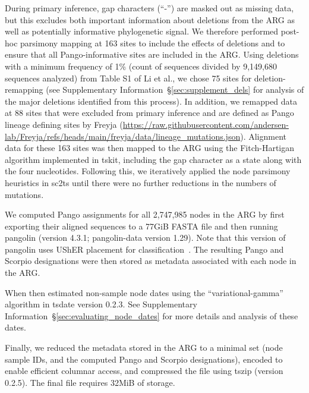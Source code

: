 \documentclass[12pt]{article}
\newcommand{\supref}[1]{Supplementary Information~\S\ref{#1}}
\begin{document}
During primary inference, gap characters (``-'') are masked
out as missing data, but this excludes both important information
about deletions from the ARG as well as potentially informative
phylogenetic signal.
We therefore performed post-hoc parsimony mapping at 163 sites to include
the effects of deletions and to ensure that all Pango-informative
sites are included in the ARG.
Using deletions with a minimum frequency of 1\%
(count of sequences divided by 9,149,680 sequences analyzed)
from Table S1 of Li et al.\cite{Li2023indels},
we chose 75 sites for deletion-remapping (see \supref{sec:supplement_dels} for analysis of the major deletions identified from this process).
In addition, we remapped data at 88 sites that were excluded
from primary inference and are defined as Pango lineage
defining sites by Freyja\cite{Karthikeyan2022}
(\url{https://raw.githubusercontent.com/andersen-lab/Freyja/refs/heads/main/freyja/data/lineage\_mutations.json}).
Alignment data for these 163 sites was then mapped to the
ARG using the Fitch-Hartigan algorithm\cite{Fitch1971toward,Hartigan1973minimum}
implemented in tskit, including the gap character as a state
along with the four nucleotides.
Following this, we iteratively applied the node parsimony
heuristics in sc2ts until there were no further reductions in
the numbers of mutations.

We computed Pango assignments for all 2,747,985 nodes in the ARG by first
exporting their aligned sequences to a 77GiB FASTA file and
then running pangolin (version 4.3.1; pangolin-data version 1.29).
Note that this version of pangolin uses UShER placement
for classification~\cite{McBroome2024}.
The resulting Pango and Scorpio designations were then stored as
metadata associated with each node in the ARG.

When then estimated non-sample node dates using
the ``variational-gamma'' algorithm in tsdate\cite{Wohns2022,Pope2025}
version 0.2.3. See \supref{sec:evaluating_node_dates} for
more details and analysis of these dates.

Finally, we reduced the metadata stored in the ARG to a minimal
set (node sample IDs, and the computed Pango and Scorpio
designations), encoded to enable efficient columnar access,
and compressed the file using tszip (version 0.2.5). The final
file requires 32MiB of storage.

\end{document}
